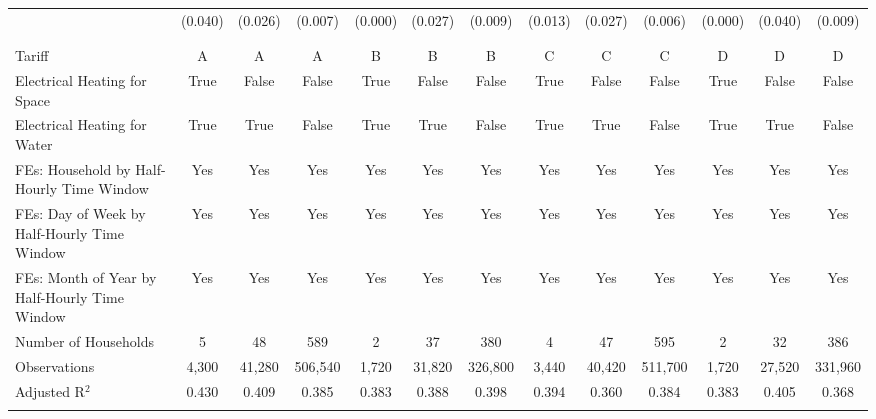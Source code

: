 \begin{table}[!htbp]
\begin{tabular}{@{\extracolsep{20pt}}lcccccccccccc}
  & (0.040) & (0.026) & (0.007) & (0.000) & (0.027) & (0.009) & (0.013) & (0.027) & (0.006) & (0.000) & (0.040) & (0.009) \\ 
  & & & & & & & & & & & & \\ 
\hline \\[-1.8ex] 
Tariff & A & A & A & B & B & B & C & C & C & D & D & D \\ 
Electrical Heating for Space & True & False & False & True & False & False & True & False & False & True & False & False \\ 
Electrical Heating for Water & True & True & False & True & True & False & True & True & False & True & True & False \\ 
FEs: Household by Half-Hourly Time Window & Yes & Yes & Yes & Yes & Yes & Yes & Yes & Yes & Yes & Yes & Yes & Yes \\ 
FEs: Day of Week by Half-Hourly Time Window & Yes & Yes & Yes & Yes & Yes & Yes & Yes & Yes & Yes & Yes & Yes & Yes \\ 
FEs: Month of Year by Half-Hourly Time Window & Yes & Yes & Yes & Yes & Yes & Yes & Yes & Yes & Yes & Yes & Yes & Yes \\ 
Number of Households &   5 &  48 & 589 &   2 &  37 & 380 &   4 &  47 & 595 &   2 &  32 & 386 \\ 
Observations & 4,300 & 41,280 & 506,540 & 1,720 & 31,820 & 326,800 & 3,440 & 40,420 & 511,700 & 1,720 & 27,520 & 331,960 \\ 
Adjusted R$^{2}$ & 0.430 & 0.409 & 0.385 & 0.383 & 0.388 & 0.398 & 0.394 & 0.360 & 0.384 & 0.383 & 0.405 & 0.368 \\ 
\hline 
\hline \\[-1.8ex] 
\end{tabular} 
\end{table} 

